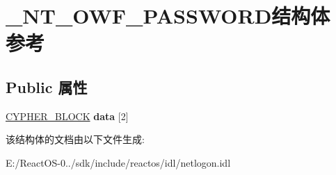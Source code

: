 \hypertarget{struct___n_t___o_w_f___p_a_s_s_w_o_r_d}{}\section{\+\_\+\+N\+T\+\_\+\+O\+W\+F\+\_\+\+P\+A\+S\+S\+W\+O\+R\+D结构体 参考}
\label{struct___n_t___o_w_f___p_a_s_s_w_o_r_d}
\subsection*{Public 属性}
\begin{DoxyCompactItemize}
\item 
\mbox{\label{struct___n_t___o_w_f___p_a_s_s_w_o_r_d_a2f6dfbc1c933d35e9514f974c08eed92}} 
\hyperlink{struct___c_y_p_h_e_r___b_l_o_c_k}{C\+Y\+P\+H\+E\+R\+\_\+\+B\+L\+O\+CK} {\bfseries data} \mbox{[}2\mbox{]}
\end{DoxyCompactItemize}


该结构体的文档由以下文件生成\+:\begin{DoxyCompactItemize}
\item 
E\+:/\+React\+O\+S-\/0../sdk/include/reactos/idl/netlogon.\+idl\end{DoxyCompactItemize}
